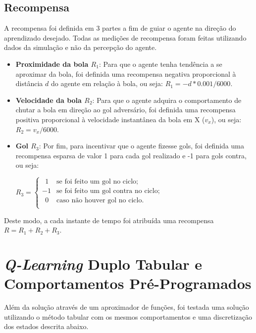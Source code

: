 \subsection{Recompensa}
\label{subsubsec:reward}

A recompensa foi definida em 3 partes a fim de guiar o agente na direção do aprendizado desejado. Todas as medições de recompensa foram feitas utilizando dados da simulação e não da percepção do agente.

\begin{itemize}
	\item \textbf{Proximidade da bola $R_1$}: Para que o agente tenha tendência a se aproximar da bola, foi definida uma recompensa negativa proporcional à distância $d$ do agente em relação à bola, ou seja: $R_1 = -d*0.001/6000$.
	
	\item \textbf{Velocidade da bola $R_2$}: Para que o agente adquira o comportamento de chutar a bola em direção ao gol adversário, foi definida uma recompensa positiva proporcional à velocidade instantânea da bola em X ($v_x$), ou seja: $R_2 = v_x/6000$.
	
	\item \textbf{Gol $R_3$}: Por fim, para incentivar que o agente fizesse gols, foi definida uma recompensa esparsa de valor 1 para cada gol realizado e -1 para gols contra, ou seja:
	
	$
	R_3 =
	\left\{
	\begin{array}{ll}
		\ \ 1  & \mbox{se foi feito um gol no ciclo}; \\
		-1  & \mbox{se foi feito um gol contra no ciclo}; \\
		\ \ 0  & \mbox{caso não houver gol no ciclo}. \\
	\end{array}
	\right.
	$
\end{itemize}

Deste modo, a cada instante de tempo foi atribuída uma recompensa $R = R_1 + R_2 + R_3$.

\section{\textit{Q-Learning} Duplo Tabular e Comportamentos Pré-Programados}

Além da solução através de um aproximador de funções, foi testada uma solução utilizando o método tabular com os mesmos comportamentos e uma discretização dos estados descrita abaixo.

